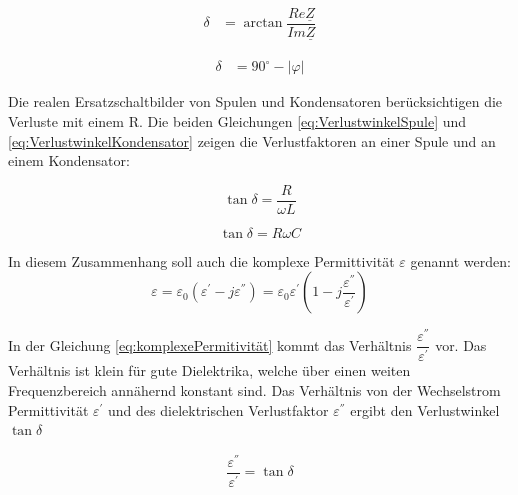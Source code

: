 \label{eq:Verlustwinkel}
\begin{align}
\delta &= \arctan \dfrac{Re\underline{Z}}{Im\underline{Z}}
\end{align}

\label{eq:Verlustwinkel_aus_Phi}
\begin{align}
\delta &= 90^\circ - |\varphi|
\end{align}

Die realen Ersatzschaltbilder von Spulen und Kondensatoren berücksichtigen die Verluste mit einem R.
Die beiden Gleichungen \ref{eq:VerlustwinkelSpule} und \ref{eq:VerlustwinkelKondensator} zeigen die Verlustfaktoren an einer Spule und an einem Kondensator:

\begin{equation}\label{eq:VerlustwinkelSpule}
\tan \delta = \dfrac{R}{\omega L}
\end{equation}

\begin{equation} \label{eq:VerlustwinkelKondensator}
\tan \delta = R \omega C
\end{equation}

In diesem Zusammenhang soll auch die komplexe Permittivität $\varepsilon$ genannt werden:
\begin{equation} \label{eq:komplexePermitivität}
\varepsilon=\varepsilon_0(\varepsilon^{'}-j\varepsilon^{''})=\varepsilon_0\varepsilon^{'}(1-j\dfrac{\varepsilon^{''}}{\varepsilon^{'}})
\end{equation}

In der Gleichung \ref{eq:komplexePermitivität} kommt das Verhältnis $\dfrac{\varepsilon^{''}}{\varepsilon^{'}}$ vor. Das Verhältnis ist klein für gute Dielektrika, welche über einen weiten Frequenzbereich annähernd konstant sind. Das Verhältnis von der Wechselstrom Permittivität $\varepsilon^{'}$ und des dielektrischen Verlustfaktor $\varepsilon^{''}$ ergibt den Verlustwinkel $\tan\delta$

\begin{equation} \label{eq:VerlustwinkelEpsilonPermitivität}
\dfrac{\varepsilon^{''}}{\varepsilon^{'}}=\tan\delta
\end{equation}



